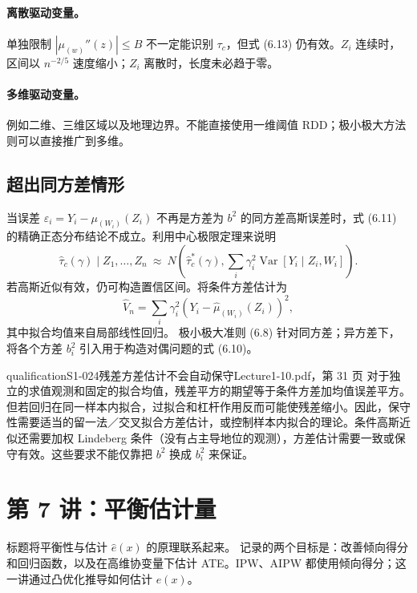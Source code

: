 \paragraph{离散驱动变量。}
单独限制 $|\mu_{(w)}''(z)|\leq B$ 不一定能识别 $\tau_c$，但式 (6.13) 仍有效。$Z_i$ 连续时，区间以 $n^{-2/5}$ 速度缩小；$Z_i$ 离散时，长度未必趋于零。
\paragraph{多维驱动变量。}
例如二维、三维区域以及地理边界。不能直接使用一维阈值 RDD；极小极大方法则可以直接推广到多维。
\subsection{超出同方差情形}
当误差 $\varepsilon_i=Y_i-\mu_{(W_i)}(Z_i)$ 不再是方差为 $b^2$ 的同方差高斯误差时，式 (6.11) 的精确正态分布结论不成立。利用中心极限定理来说明
\[
\widehat\tau_c(\gamma)\mid Z_1,\ldots,Z_n
\ \approx\ N\left(\widehat\tau_c^*(\gamma),
\sum_i\gamma_i^2\operatorname{Var}[Y_i\mid Z_i,W_i]\right).
\tag{原笔记 6.14}
\]
若高斯近似有效，仍可构造置信区间。将条件方差估计为
\[
\widehat V_n=\sum_i\gamma_i^2(Y_i-\widehat\mu_{(W_i)}(Z_i))^2,
\]
其中拟合均值来自局部线性回归。
极小极大准则 (6.8) 针对同方差；异方差下，将各个方差 $b_i^2$ 引入用于构造对偶问题的式 (6.10)。
\begin{reviewnote}{qualification}{S1-024}{残差方差估计不会自动保守}{Lecture1-10.pdf，第 31 页}
对于独立的求值观测和固定的拟合均值，残差平方的期望等于条件方差加均值误差平方。但若回归在同一样本内拟合，过拟合和杠杆作用反而可能使残差缩小。因此，保守性需要适当的留一法／交叉拟合方差估计，或控制样本内拟合的理论。条件高斯近似还需要加权 Lindeberg 条件（没有占主导地位的观测），方差估计需要一致或保守有效。这些要求不能仅靠把 $b^2$ 换成 $b_i^2$ 来保证。
\end{reviewnote}

\section{第 7 讲：平衡估计量}
标题将平衡性与估计 $\widehat e(x)$ 的原理联系起来。
记录的两个目标是：改善倾向得分和回归函数，以及在高维协变量下估计 ATE。IPW、AIPW 都使用倾向得分；这一讲通过凸优化推导如何估计 $e(x)$。
